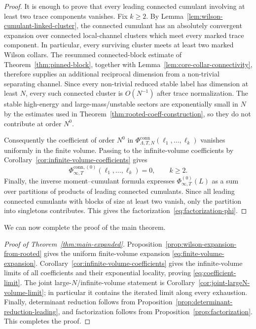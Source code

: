 \documentclass[11pt,a4paper,reqno]{amsart}
\theoremstyle{definition}
\theoremstyle{remark}
\newcommand\conn{{\mathrm{conn}}}
\begin{document}
\begin{proof}
It is enough to prove that every leading connected cumulant involving at least two trace components vanishes. Fix $k\ge2$. By Lemma~\ref{lem:wilson-cumulant-linked-cluster}, the connected cumulant has an absolutely convergent expansion over connected local-channel clusters which meet every marked trace component. In particular, every surviving cluster meets at least two marked Wilson collars. The resummed connected-block estimate of Theorem~\ref{thm:pinned-block}, together with Lemma~\ref{lem:core-collar-connectivity}, therefore supplies an additional reciprocal dimension from a non-trivial separating channel. Since every non-trivial reduced stable label has dimension at least $N$, every such connected cluster is $O(N^{-1})$ after trace normalization. The stable high-energy and large-mass/unstable sectors are exponentially small in $N$ by the estimates used in Theorem~\ref{thm:rooted-coeff-construction}, so they do not contribute at order $N^0$.

Consequently the coefficient of order $N^0$ in $\Phi^{\conn}_{\Lambda,T,N}(\ell_1,\ldots,\ell_k)$ vanishes uniformly in the finite volume. Passing to the infinite-volume coefficients by Corollary~\ref{cor:infinite-volume-coefficients} gives
\[
\Phi^{\conn,(0)}_{\infty,T}(\ell_1,\ldots,\ell_k)=0, \qquad k\ge2.
\]
Finally, the inverse moment--cumulant formula expresses \(\Phi^{(0)}_{\infty,T}(L)\) as a sum over partitions of products of leading connected cumulants. Since all leading connected cumulants with blocks of size at least two vanish, only the partition into singletons contributes. This gives the factorization~\eqref{eq:factorization-phi}.
\end{proof}


We can now complete the proof of the main theorem.

\begin{proof}[Proof of Theorem~\ref{thm:main-expanded}]
Proposition~\ref{prop:wilson-expansion-from-rooted} gives the uniform finite-volume expansion \eqref{eq:finite-volume-expansion}.  Corollary~\ref{cor:infinite-volume-coefficients} gives the infinite-volume limits of all coefficients and their exponential locality, proving \eqref{eq:coefficient-limit}.  The joint large-$N$/infinite-volume statement is Corollary~\ref{cor:joint-largeN-volume-limit}; in particular it contains the iterated limit along every exhaustion.  Finally, determinant reduction follows from Proposition~\ref{prop:determinant-reduction-leading}, and factorization follows from Proposition~\ref{prop:factorization}.  This completes the proof.
\end{proof}
\end{document}
